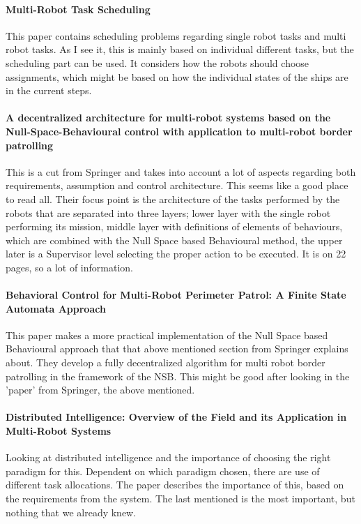 \paragraph{Multi-Robot Task Scheduling}
This paper contains scheduling problems regarding single robot tasks and multi robot tasks. As I see it, this is mainly based on individual different tasks, but the scheduling part can be used. It considers how the robots should choose assignments, which might be based on how the individual states of the ships are in the current steps.

\paragraph{A decentralized architecture for multi-robot systems based on the Null-Space-Behavioural control with application to multi-robot border patrolling}
This is a cut from Springer and takes into account a lot of aspects regarding both requirements, assumption and control architecture. This seems like a good place to read all. Their focus point is the architecture of the tasks performed by the robots that are separated into three layers; lower layer with the single robot performing its mission, middle layer with definitions of elements of behaviours, which are combined with the Null Space based Behavioural method, the upper later is a Supervisor level selecting the proper action to be executed. It is on 22 pages, so a lot of information.

\paragraph{Behavioral Control for Multi-Robot Perimeter Patrol: A Finite State Automata Approach}
This paper makes a more practical implementation of the Null Space based Behavioural approach that that above mentioned section from Springer explains about. They develop a fully decentralized algorithm for multi robot border patrolling in the framework of the NSB.
This might be good after looking in the 'paper' from Springer, the above mentioned.

{\vskip0pt\color{gray}
\paragraph{Distributed Intelligence: Overview of the Field and its Application in Multi-Robot Systems}
Looking at distributed intelligence and the importance of choosing the right paradigm for this. Dependent on which paradigm chosen, there are use of different task allocations. The paper describes the importance of this, based on the requirements from the system.
The last mentioned is the most important, but nothing that we already knew.}

